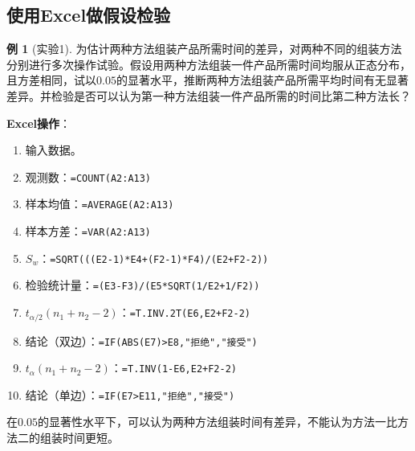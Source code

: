 \documentclass[11pt,a4paper]{report}
\theoremstyle{definition}
\newtheorem{example}{例}[chapter]
\theoremstyle{plain}
\begin{document}
\subsection{使用Excel做假设检验}

\begin{example}[实验1]
为估计两种方法组装产品所需时间的差异，对两种不同的组装方法分别进行多次操作试验。假设用两种方法组装一件产品所需时间均服从正态分布，且方差相同，试以$0.05$的显著水平，推断两种方法组装产品所需平均时间有无显著差异。并检验是否可以认为第一种方法组装一件产品所需的时间比第二种方法长？

\textbf{Excel操作}：
\begin{enumerate}[label=\arabic*.,leftmargin=2em]
    \item 输入数据。
    \item 观测数：\texttt{=COUNT(A2:A13)}
    \item 样本均值：\texttt{=AVERAGE(A2:A13)}
    \item 样本方差：\texttt{=VAR(A2:A13)}
    \item $S_w$：\texttt{=SQRT(((E2-1)*E4+(F2-1)*F4)/(E2+F2-2))}
    \item 检验统计量：\texttt{=(E3-F3)/(E5*SQRT(1/E2+1/F2))}
    \item $t_{\alpha/2}(n_1+n_2-2)$：\texttt{=T.INV.2T(E6,E2+F2-2)}
    \item 结论（双边）：\texttt{=IF(ABS(E7)>E8,"拒绝","接受")}
    \item $t_{\alpha}(n_1+n_2-2)$：\texttt{=T.INV(1-E6,E2+F2-2)}
    \item 结论（单边）：\texttt{=IF(E7>E11,"拒绝","接受")}
\end{enumerate}

在$0.05$的显著性水平下，可以认为两种方法组装时间有差异，不能认为方法一比方法二的组装时间更短。
\end{example}
\end{document}
